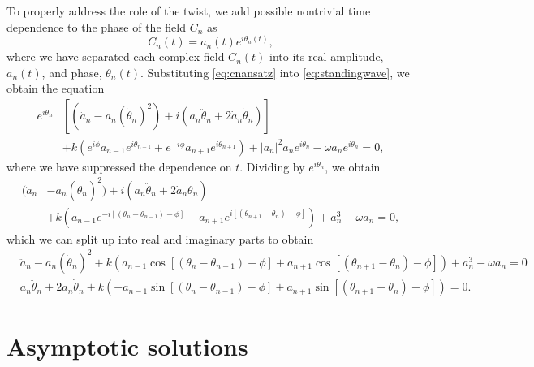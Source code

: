 \documentclass[11pt,reqno]{amsart}
\begin{document}
To properly address the role of the twist, we add possible nontrivial time dependence to the phase of the field $C_n$ as
\begin{equation}\label{eq:cnansatz}
C_n(t) = a_n(t)e^{i \theta_n(t)},
\end{equation}
where we have separated each complex field $C_n(t)$ into its real amplitude, $a_n(t)$, and phase, $\theta_n(t)$. Substituting \cref{eq:cnansatz} into \cref{eq:standingwave}, we obtain the equation
\begin{align*}
e^{i \theta_n}&\left[ (\ddot a_n - a_n (\dot \theta_n)^2) 
+ i ( a_n \ddot\theta_n + 2 \dot a_n \dot \theta_n ) \right] \\
&+ k\left(e^{i\phi}a_{n-1}e^{i \theta_{n-1}} +e^{-i\phi}a_{n+1}e^{i \theta_{n+1}}\right)+|a_n|^2 a_n e^{i \theta_n} - \omega a_n e^{i \theta_n} = 0,
\end{align*}
where we have suppressed the dependence on $t$. Dividing by $e^{i \theta_n}$, we obtain
\begin{equation}\label{eq:st2}
\begin{aligned}
(\ddot a_n &- a_n (\dot \theta_n)^2) 
+ i ( a_n \ddot\theta_n + 2 \dot a_n \dot \theta_n )\\
&+ k\left(a_{n-1}e^{-i[(\theta_n - \theta_{n-1}) - \phi]} + a_{n+1}e^{i[(\theta_{n+1} - \theta_{n}) - \phi]} \right)+a_n^3 - \omega a_n = 0,
\end{aligned}
\end{equation}  
which we can split up into real and imaginary parts to obtain
\begin{align}
&\ddot a_n - a_n (\dot \theta_n)^2 +
 k\left(a_{n-1}\cos[(\theta_n - \theta_{n-1}) - \phi] + a_{n+1}\cos[(\theta_{n+1} - \theta_{n}) - \phi] \right)+a_n^3 - \omega a_n = 0 \label{eq:st2real} \\
&a_n \ddot\theta_n + 2 \dot a_n \dot \theta_n
+ k\left(-a_{n-1}\sin[(\theta_n - \theta_{n-1}) - \phi] + a_{n+1}\sin [(\theta_{n+1} - \theta_{n}) - \phi] \right) = 0. \label{eq:st2imag}
\end{align}

\section{Asymptotic solutions}\label{sec:asymp}
\end{document}
